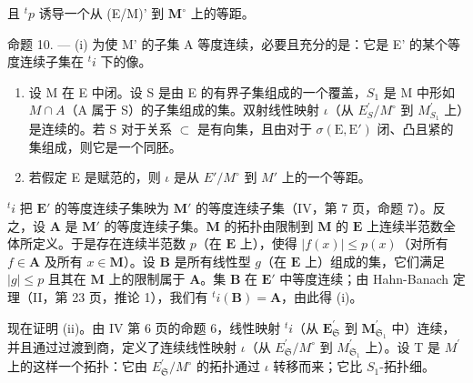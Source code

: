 且 \({}^t p\) 诱导一个从 (E/M)' 到 \({\mathbf{M}}^{ \circ  }\) 上的等距。

命题 10. --- (i) 为使 M' 的子集 A 等度连续，必要且充分的是：它是 E' 的某个等度连续子集在 \({}^t i\) 下的像。

\begin{enumerate}
\def\labelenumi{(\roman{enumi})}
\setcounter{enumi}{1}
\item
  设 M 在 E 中闭。设 S 是由 E 的有界子集组成的一个覆盖，\(S_{1}\) 是 M 中形如 \(M \cap A\)（A 属于 S）的子集组成的集。双射线性映射 \(\iota\)（从 \(E_{S}^{\prime}/M^{\circ}\) 到 \(M_{S_{1}}^{\prime}\) 上）是连续的。若 S 对于关系 \(\subset\) 是有向集，且由对于 \(\sigma(\mathrm{E}, \mathrm{E}')\) 闭、凸且紧的集组成，则它是一个同胚。
\item
  若假定 E 是赋范的，则 \(\iota\) 是从 \(E'/M^{\circ}\) 到 \(M'\) 上的一个等距。
\end{enumerate}

\({}^t i\) 把 \(\mathbf{E}'\) 的等度连续子集映为 \(\mathbf{M}'\) 的等度连续子集（IV，第 7 页，命题 7）。反之，设 \(\mathbf{A}\) 是 \(\mathbf{M}'\) 的等度连续子集。\(\mathbf{M}\) 的拓扑由限制到 \(\mathbf{M}\) 的 \(\mathbf{E}\) 上连续半范数全体所定义。于是存在连续半范数 \(p\)（在 \(\mathbf{E}\) 上），使得 \(|f(x)| \leqslant p(x)\)（对所有 \(f \in \mathbf{A}\) 及所有 \(x \in \mathbf{M}\)）。设 \(\mathbf{B}\) 是所有线性型 \(g\)（在 \(\mathbf{E}\) 上）组成的集，它们满足 \(|g| \leqslant p\) 且其在 \(\mathbf{M}\) 上的限制属于 \(\mathbf{A}\)。集 \(\mathbf{B}\) 在 \(\mathbf{E}'\) 中等度连续；由 Hahn-Banach 定理（II，第 23 页，推论 1），我们有 \({}^t i(\mathbf{B}) = \mathbf{A}\)，由此得 (i)。

现在证明 (ii)。由 IV 第 6 页的命题 6，线性映射 \({}^t i\)（从 \(\mathbf{E}_{\mathfrak{S}}^{\prime}\) 到 \(\mathbf{M}_{\mathfrak{S}_1}^{\prime}\) 中）连续，并且通过过渡到商，定义了连续线性映射 \(\iota\)（从 \(E_{\mathfrak{S}}^{\prime}/M^{\circ}\) 到 \(M_{\mathfrak{S}_{1}}^{\prime}\) 上）。设 T 是 \(M^{\prime}\) 上的这样一个拓扑：它由 \(E_{\mathfrak{S}}^{\prime}/M^{\circ}\) 的拓扑通过 \(\iota\) 转移而来；它比 \(S_{1}\)-拓扑细。

